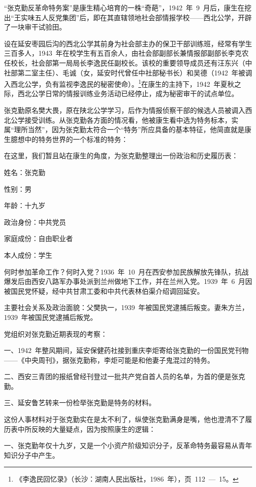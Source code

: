 “张克勤反革命特务案”是康生精心培育的一株“奇葩”，1942~年~9~月后，康生在挖出“王实味五人反党集团”后，即在其直辖领地社会部情报学校——西北公学，开辟了一块审干试验田。

设在延安枣园后沟的西北公学其前身为社会部主办的保卫干部训练班，经常有学生三百多人，1943~年在校学生有五百余人，由社会部副部长兼情报部副部长李克农任校长，社会部第一局局长李逸民任副校长。该校的重要领导成员还有汪东兴（中社部第二室主任）、毛诚（女，延安时代曾任中社部秘书长）和吴德（1942~年被调入西北公学，负有监视李逸民的秘密使命）。\footnote{《李逸民回忆录》（长沙：湖南人民出版社，1986~年），页~112~—~15。}在康生的主持下，1942~年夏秋之际，西北公学日常的情报训练业务活动已经停止，成为秘密审干的试点单位。

张克勤原名樊大畏，原在陕北公学学习，后作为情报侦察干部的候选人员被调入西北公学接受训练。从张克勤各方面的情况看，他被康生看中选为特务标本，实属“理所当然”，因为张克勤太符合一个“特务”所应具备的基本特征，他简直就是康生臆想中的特务世界的一个标准的特务：

在这里，我们暂且站在康生的角度，为张克勤整理出一份政治和历史履历表：

\begin{quoting}
姓名：张克勤

性别：男

年龄：十九岁

政治身份：中共党员

家庭成份：自由职业者

本人成份：学生

何时参加革命工作？何时入党？1936~年~10~月在西安参加民族解放先锋队，抗战爆发后由西安八路军办事处派到兰州做地下工作，并在兰州入党。1939~年~6~月因被国民党怀疑，经中共甘肃工委和中共代表林伯渠介绍调回延安。

主要社会关系及政治面貌：父樊执一，1939~年被国民党逮捕后叛变。妻朱方兰，1939~年被国民党逮捕后叛党。

党组织对张克勤近期表现的考察：

一、1942~年整风期间，延安保健药社接到重庆李炬寄给张克勤的一份国民党刊物——《中央周刊》，据张克勤称，李炬可能是和他妻子鬼混过的特务。

二、西安三青团的报纸曾经刊登过一批共产党自首人员的名单，为首的便是张克勤。

三、延安鲁艺转来一份检举张克勤是特务的材料。
\end{quoting}

这份人事材料对于张克勤实在是太不利了，纵使张克勤满身是嘴，他也澄清不了履历表中所反映的大量疑点，因为按照康生的逻辑：

一、张克勤年仅十九岁，又是一个小资产阶级知识分子，反革命特务最容易从青年知识分子中产生。

